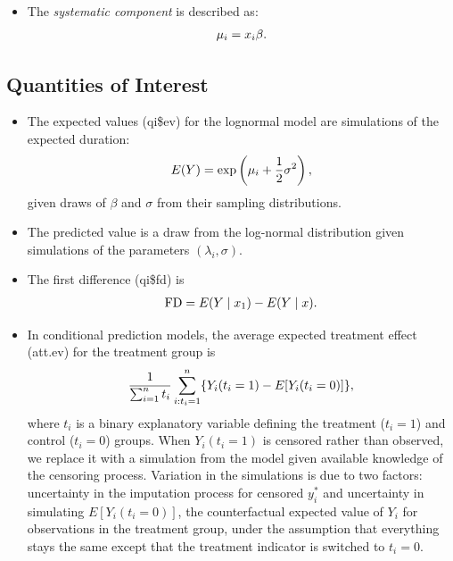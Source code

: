 \documentclass[letterpaper,10pt,english]{sphinxmanual}
\begin{document}
\begin{itemize}
\item {} 
The \emph{systematic component} is described as:
\begin{gather}
\begin{split}\mu_i = x_i \beta .\end{split}\notag
\end{gather}
\end{itemize}


\subsection{Quantities of Interest}
\label{vignette:id16}\begin{itemize}
\item {} 
The expected values (qi\$ev) for the lognormal model are simulations
of the expected duration:
\begin{gather}
\begin{split}E(Y) =  \exp\left(\mu_i + \frac{1}{2}\sigma^2 \right),\end{split}\notag
\end{gather}
given draws of \(\beta\) and \(\sigma\) from their sampling
distributions.

\item {} 
The predicted value is a draw from the log-normal distribution given
simulations of the parameters \((\lambda_i, \sigma)\).

\item {} 
The first difference (qi\$fd) is
\begin{gather}
\begin{split}\textrm{FD} = E(Y \mid x_1) - E(Y \mid x).\end{split}\notag
\end{gather}
\item {} 
In conditional prediction models, the average expected treatment
effect (att.ev) for the treatment group is
\begin{gather}
\begin{split}\frac{1}{\sum_{i=1}^n t_i}\sum_{i:t_i=1}^n \{ Y_i(t_i=1) - E[Y_i(t_i=0)] \},\end{split}\notag
\end{gather}
where \(t_i\) is a binary explanatory variable defining the
treatment (\(t_i=1\)) and control (\(t_i=0\)) groups. When
\(Y_i(t_i=1)\) is censored rather than observed, we replace it
with a simulation from the model given available knowledge of the
censoring process. Variation in the simulations is due to two
factors: uncertainty in the imputation process for censored
\(y_i^*\) and uncertainty in simulating \(E[Y_i(t_i=0)]\),
the counterfactual expected value of \(Y_i\) for observations in
the treatment group, under the assumption that everything stays the
same except that the treatment indicator is switched to
\(t_i=0\).


\end{itemize}
\end{document}
